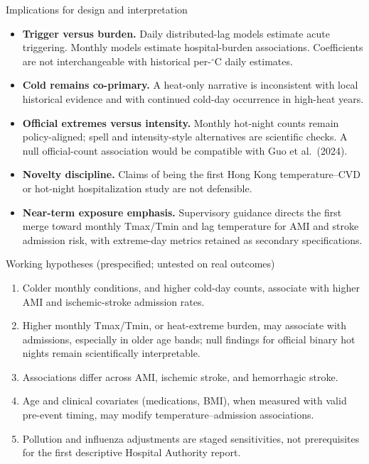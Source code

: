 \documentclass[aspectratio=169,10pt]{beamer}
\begin{document}
\begin{frame}{Implications for design and interpretation}
  \begin{itemize}
    \item \textbf{Trigger versus burden.} Daily distributed-lag models estimate acute triggering. Monthly models estimate hospital-burden associations. Coefficients are not interchangeable with historical per-$^\circ$C daily estimates.
    \item \textbf{Cold remains co-primary.} A heat-only narrative is inconsistent with local historical evidence and with continued cold-day occurrence in high-heat years.
    \item \textbf{Official extremes versus intensity.} Monthly hot-night counts remain policy-aligned; spell and intensity-style alternatives are scientific checks. A null official-count association would be compatible with Guo et al.\ (2024).
    \item \textbf{Novelty discipline.} Claims of being the first Hong Kong temperature--CVD or hot-night hospitalization study are not defensible.
    \item \textbf{Near-term exposure emphasis.} Supervisory guidance directs the first merge toward monthly Tmax/Tmin and lag temperature for AMI and stroke admission risk, with extreme-day metrics retained as secondary specifications.
  \end{itemize}
\end{frame}

\begin{frame}{Working hypotheses (prespecified; untested on real outcomes)}
  \begin{enumerate}
    \item Colder monthly conditions, and higher cold-day counts, associate with higher AMI and ischemic-stroke admission rates.
    \item Higher monthly Tmax/Tmin, or heat-extreme burden, may associate with admissions, especially in older age bands; null findings for official binary hot nights remain scientifically interpretable.
    \item Associations differ across AMI, ischemic stroke, and hemorrhagic stroke.
    \item Age and clinical covariates (medications, BMI), when measured with valid pre-event timing, may modify temperature--admission associations.
    \item Pollution and influenza adjustments are staged sensitivities, not prerequisites for the first descriptive Hospital Authority report.
  \end{enumerate}
\end{frame}
\end{document}
